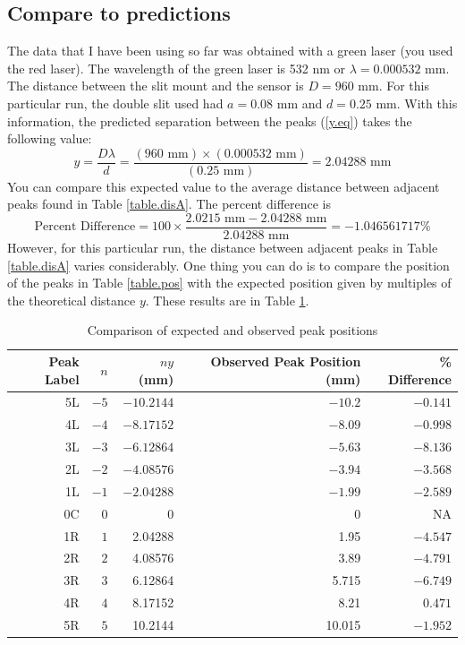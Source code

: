 \subsection{Compare to  predictions}
The data that I have been using so far was obtained with a green laser (you used the red laser). The wavelength of the green laser is 532 nm or $\lambda = 0.000532$ mm. The distance between the slit mount and the sensor is $D = 960$ mm. For this particular run, the double slit used had $a = 0.08$ mm and $d = 0.25$ mm. With this information, the predicted separation between the peaks (\ref{y.eq}) takes the following value:
\begin{equation}
	y = \frac{D \lambda}{d} = \frac{(960 \text{ mm}) \times (0.000532 \text{ mm})}{(0.25 \text{ mm})} = 2.04288 \text{ mm}
\end{equation}
You can compare this expected value to the average distance between adjacent peaks found in Table \ref{table.disA}. The percent difference is
\begin{equation}
	\text{Percent Difference} = 100 \times \frac{2.0215 \text{ mm} - 2.04288 \text{ mm}}{2.04288 \text{ mm}} = -1.046561717 \%
\end{equation}
However, for this particular run, the distance between adjacent peaks in Table \ref{table.disA} varies considerably. One thing you can do is to compare the position of the peaks in Table \ref{table.pos} with the expected position given by multiples of the theoretical distance $y$. These results are in Table \ref{compa}.
\begin{table}[ht!]
	\centering
	\begin{tabular}{|r|r|r|r|r|} \hline
		Peak Label & $n$ & $n y$ (mm) & Observed Peak Position (mm) & \% Difference \\
		\hline
		5L & $-5$ & $-10.2144$ & $-10.2$ & $-0.141$ \\
		4L & $-4$ & $-8.17152$ & $-8.09$ & $-0.998$ \\
		3L & $-3$ & $-6.12864$ & $-5.63$ & $-8.136$ \\
		2L & $-2$ & $-4.08576$ & $-3.94$ & $-3.568$ \\
		1L & $-1$ & $-2.04288$ & $-1.99$ & $-2.589$ \\
		0C & $0$ & 0 & 0 & NA \\
		1R & $1$ & 2.04288 & 1.95 & $-4.547$ \\
		2R & $2$ & 4.08576 & 3.89 & $-4.791$ \\
		3R & $3$ & 6.12864 & 5.715 & $-6.749$ \\
		4R & $4$ & 8.17152 & 8.21 & $0.471$ \\
		5R & $5$ & 10.2144 & 10.015 & $-1.952$ \\
		\hline
	\end{tabular}
	\caption{Comparison of expected and observed peak positions}
	\label{compa}
\end{table}
